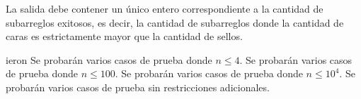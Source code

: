 \documentclass{oci}
\begin{document}
\begin{outputDescription}
La salida debe contener un único entero correspondiente a la cantidad
de subarreglos exitosos, es decir, la cantidad de subarreglos donde
la cantidad de caras es estrictamente mayor que la cantidad de sellos.
\end{outputDescription}

\begin{scoreDescription}ieron
	 Se probarán varios casos de prueba donde $n \leq 4$.
	 Se probarán varios casos de prueba donde $n \leq 100$.
  	 Se probarán varios casos de prueba donde $n \leq 10^4$.
	 Se probarán varios casos de prueba sin restricciones adicionales.
\end{scoreDescription}

\begin{sampleDescription}
\end{sampleDescription}
\end{document}

